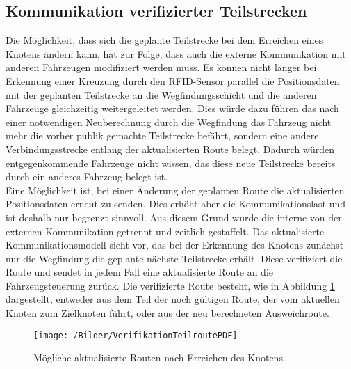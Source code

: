 	\subsection{Kommunikation verifizierter Teilstrecken}
		\label{Anpassung Kommunikation}
		Die Möglichkeit, dass sich die geplante Teilstrecke bei dem Erreichen eines Knotens ändern kann, hat zur Folge, dass auch die externe Kommunikation mit anderen Fahrzeugen modifiziert werden muss. Es können nicht länger bei Erkennung einer Kreuzung durch den \ac{RFID}-Sensor parallel die Positionsdaten mit der geplanten Teilstrecke an die Wegfindungsschicht und die anderen Fahrzeuge gleichzeitig weitergeleitet werden. Dies würde dazu führen das nach einer notwendigen Neuberechnung durch die Wegfindung das Fahrzeug nicht mehr die vorher publik gemachte Teilstrecke befährt, sondern eine andere Verbindungsstrecke entlang der aktualisierten Route belegt. Dadurch würden entgegenkommende Fahrzeuge nicht wissen, das diese neue Teilstrecke bereits durch ein anderes Fahrzeug belegt ist.
		\\[4pt]
		Eine Möglichkeit ist, bei einer Änderung der geplanten Route die aktualisierten Positionsdaten erneut zu senden. Dies erhöht aber die Kommunikationslast und ist deshalb nur begrenzt sinnvoll. Aus diesem Grund  wurde die interne von der externen Kommunikation getrennt und zeitlich gestaffelt. Das aktualisierte Kommunikationsmodell sieht vor, das bei der Erkennung des Knotens zunächst nur die Wegfindung die geplante nächste Teilstrecke erhält. Diese verifiziert die Route und sendet in jedem Fall eine aktualisierte Route an die Fahrzeugsteuerung zurück. Die verifizierte Route besteht, wie in Abbildung \ref{MoeglicheTeilrouten} dargestellt, entweder aus dem Teil der noch gültigen Route, der vom aktuellen Knoten zum Zielknoten führt, oder aus der neu berechneten Ausweichroute.
		
		\begin{figure}[h]
			\centering
			\texttt{[image: /Bilder/VerifikationTeilroutePDF]}
			\vspace{0.2cm}
			\caption{Mögliche aktualisierte Routen nach Erreichen des Knotens.}\label{MoeglicheTeilrouten}
		\end{figure}
		
